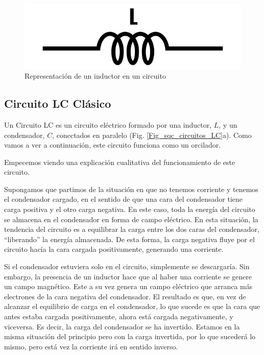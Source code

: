     \begin{figure}[h]
        \centering 
        \includegraphics[width=0.2\linewidth]{Figuras/Fig_sqc_inductor.jpg}
        \caption{Representación de un inductor en un circuito}
        \label{Fig_sqc_inductor}
    \end{figure}



    \subsection{Circuito LC Clásico} \label{sec_scq_circuito_LC_clasico}

    Un Circuito LC es un circuito eléctrico formado por una inductor, $L$, y un condensador, $C$, conectados en paralelo (Fig. \ref{Fig_sqc_circuitos_LC}a). Como vamos a ver a continuación, este circuito funciona como un orcilador.
    

        Empecemos viendo una explicación cualitativa del funcionamiento de este circuito.
        
        Supongamos que partimos de la situación en que no tenemos corriente y tenemos el condensador cargado, en el sentido de que una cara del condensador tiene carga positiva y el otro carga negativa. En este caso, toda la energía del circuito se almacena en el condensador en forma de campo eléctrico. En esta situación, la tendencia del circuito es a equilibrar la carga entre los dos caras del condensador, ``liberando'' la energía almacenada. De esta forma, la carga negativa fluye por el circuito hacía la cara cargada positivamente, generando una corriente. 
        
        Si el condensador estuviera solo en el circuito, simplemente se descargaría. Sin embargo, la presencia de un inductor hace que al haber una corriente se genere un campo magnético. Este a su vez genera un campo eléctrico que arranca más electrones de la cara negativa del condensador. El resultado es que, en vez de alcanzar el equilibrio de carga en el condensador, lo que sucede es que la cara que antes estaba cargada positivamente, ahora está cargada negativamente, y viceversa. Es decir, la carga del condensador se ha invertido. Estamos en la misma situación del principio pero con la carga invertida, por lo que sucederá lo mismo, pero está vez la corriente irá en sentido inverso.
       
